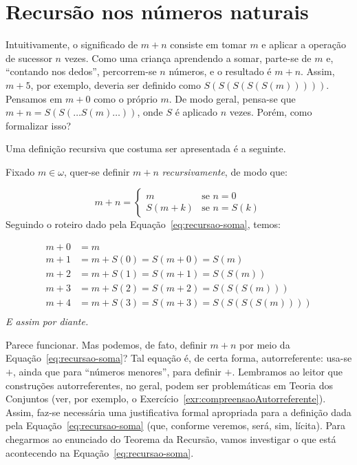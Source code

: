 \section{Recursão nos números naturais}\label{sec:recursaoNosNaturais}

Intuitivamente, o significado de $m+n$ consiste em tomar $m$ e aplicar a operação de sucessor $n$ vezes.
Como uma criança aprendendo a somar, parte-se de $m$ e, ``contando nos dedos'', percorrem-se $n$ números, e o resultado é $m+n$.
Assim, $m+5$, por exemplo, deveria ser definido como $S(S(S(S(S(m)))))$.
Pensamos em $m+0$ como o próprio $m$.
De modo geral, pensa-se que $m+n=S(S(\dots S(m)\dots))$, onde $S$ é aplicado $n$ vezes.
Porém, como formalizar isso?

Uma definição recursiva que costuma ser apresentada é a seguinte.

Fixado $m \in \omega$, quer-se definir $m+n$ \emph{recursivamente}, de modo que:

\begin{equation}\label{eq:recursao-soma}
    m+n =
    \begin{cases}
        m & \text{se } n=0\\
        S(m+k) & \text{se } n=S(k)
    \end{cases}
\end{equation}
Seguindo o roteiro dado pela Equação~\ref{eq:recursao-soma}, temos:

\begin{align*}
m+0 &= m\\
m+1 &= m+S(0) = S(m+0) = S(m)\\
m+2 &= m+S(1) = S(m+1) = S(S(m))\\
m+3 &= m+S(2) = S(m+2) = S(S(S(m)))\\
m+4 &= m+S(3) = S(m+3) = S(S(S(S(m))))\\
\end{align*}
\emph{E assim por diante.}

Parece funcionar. Mas podemos, de fato, definir $m+n$ por meio da Equação~\ref{eq:recursao-soma}?
Tal equação é, de certa forma, autorreferente: usa-se $+$, ainda que para ``números menores'', para definir $+$.
Lembramos ao leitor que construções autorreferentes, no geral, podem ser problemáticas em Teoria dos Conjuntos (ver, por exemplo, o Exercício~\ref{exr:compreensaoAutorreferente}).
Assim, faz-se necessária uma justificativa formal apropriada para a definição dada pela Equação~\ref{eq:recursao-soma} (que, conforme veremos, será, sim, lícita).
Para chegarmos ao enunciado do Teorema da Recursão, vamos investigar o que está acontecendo na Equação~\ref{eq:recursao-soma}.

